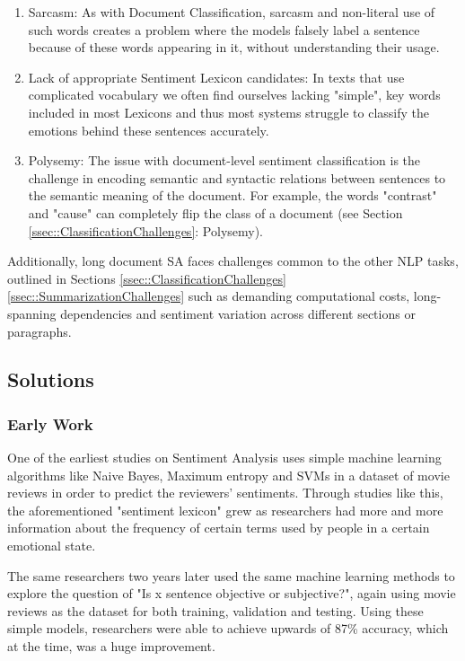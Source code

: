 \documentclass[preprint,review,12pt]{elsarticle}
\begin{document}
\begin{enumerate}
    \item Sarcasm: As with Document Classification, sarcasm and non-literal use of such words creates a problem where the models falsely label a sentence because of these words appearing in it, without understanding their usage.
    
    \item Lack of appropriate Sentiment Lexicon candidates: In texts that use complicated vocabulary we often find ourselves lacking "simple", key words included in most Lexicons and thus most systems struggle to classify the emotions behind these sentences accurately.

    \item Polysemy: The issue with document-level sentiment classification is the challenge in encoding semantic and syntactic relations between sentences to the semantic meaning of the document. For example, the words "contrast" and "cause" can completely flip the class of a document (see Section \ref{ssec::ClassificationChallenges}: Polysemy). 
\end{enumerate}

Additionally, long document SA faces challenges common to the other NLP tasks, outlined in Sections \ref{ssec::ClassificationChallenges} \ref{ssec::SummarizationChallenges} such as demanding computational costs, long-spanning dependencies and sentiment variation across different sections or paragraphs.
	
\subsection{Solutions}

\subsubsection{Early Work}

One of the earliest studies on Sentiment Analysis \cite{pang2} uses simple machine learning algorithms like Naive Bayes, Maximum entropy and SVMs in a dataset of movie reviews in order to predict the reviewers' sentiments. Through studies like this, the aforementioned "sentiment lexicon" grew as researchers had more and more information about the frequency of certain terms used by people in a certain emotional state.  

The same researchers two years later \cite{pang} used the same machine learning methods to explore the question of "Is x sentence objective or subjective?", again using movie reviews as the dataset for both training, validation and testing. Using these simple models, researchers were able to achieve upwards of 87\% accuracy, which at the time, was a huge improvement.  
\end{document}
